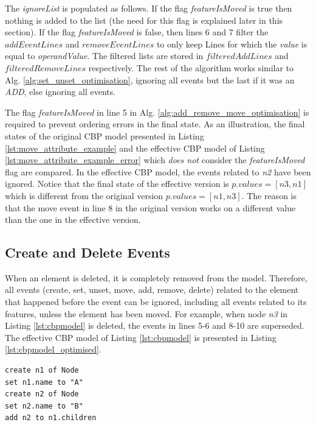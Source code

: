 \documentclass[12pt, a4paper]{report} \usepackage[titletoc]{appendix}
\begin{document}
The \emph{ignoreList} is populated as follows. If the flag \emph{featureIsMoved} is true then nothing is added to the list (the need for this flag is explained later in this section). If the flag \emph{featureIsMoved} is false, then lines 6 and 7 filter the $addEventLines$ and $removeEventLines$ to only keep Lines for which the \emph{value} is equal to \emph{operandValue}. The filtered lists are stored in $filteredAddLines$ and $filteredRemoveLines$ respectively. The rest of the algorithm works similar to Alg. \ref{alg:set_unset_optimisation}, ignoring all events but the last if it was an \emph{ADD}, else ignoring all events. 

The flag \emph{featureIsMoved} in line 5 in Alg. \ref{alg:add_remove_move_optimisation} is required to prevent ordering errors in the final state. As an illustration, the final states of the original CBP model presented in Listing  \ref{lst:move_attribute_example} and the effective CBP model of Listing \ref{lst:move_attribute_example_error} which \emph{does not} consider the \emph{featureIsMoved} flag are compared. In the effective CBP model, the events related to \emph{n2} have been ignored. Notice that the final state of the effective version is $p.values = [n3, n1]$  which is different from the original version $p.values = [n1, n3]$. The reason is that the move event in line 8 in the original version works on a different value than the one in the effective version.

\subsection{Create and Delete Events}
\label{subsec:create_and_delete_operations}
When an element is deleted, it is completely removed from the model. Therefore, all events (create, set, unset, move, add, remove, delete) related to the element that happened before the event can be ignored, including all events related to its features, unless the element has been moved. For example, when node \emph{n3} in Listing \ref{lst:cbpmodel}  is deleted, the events in lines 5-6 and 8-10 are superseded. The effective CBP model of Listing \ref{lst:cbpmodel} is presented in Listing \ref{lst:cbpmodel_optimised}.

\begin{lstlisting}[style=eol,caption={Change-based representation of the model of Fig. \ref{fig:initial_model} after removal of node \emph{n5}.},label=lst:cbpmodel_optimised]
create n1 of Node
set n1.name to "A"
create n2 of Node
set n2.name to "B"
add n2 to n1.children
\end{lstlisting}
\end{document}
